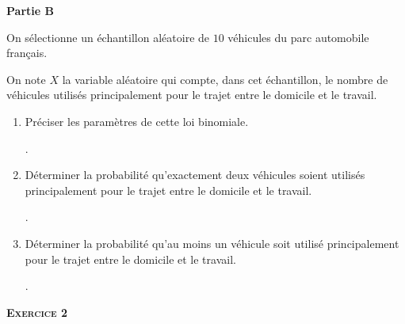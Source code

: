 \documentclass[11pt]{article}
\newcommand\Ra{\marginpar{\scalebox{.8}{\framebox[1.6ex]{\rule{0ex}{1.6ex}\raisebox{.75ex}{\rule{1.6ex}{.5pt}}}\hspace{-.3pt}\framebox[3.2ex]{Ra}}}}
\newcommand\Ca{\marginpar{\scalebox{.8}{\framebox[1.6ex]{\rule{0ex}{1.6ex}\raisebox{.75ex}{\rule{1.6ex}{.5pt}}}\hspace{-.3pt}\framebox[3.2ex]{Ca}}}}
\begin{document}
\textbf{Partie B}


On sélectionne un échantillon aléatoire de $10$ véhicules du parc automobile français. 

On note $X$ la variable aléatoire qui compte, dans cet échantillon, le nombre de véhicules utilisés principalement pour le trajet entre le domicile et le travail.

\begin{enumerate} 
\item Préciser les paramètres de cette loi binomiale.\\[25 pt]
\begin{minipage}[c]{.91\linewidth}
    .\dotfill\\
  \end{minipage}\Ra


\item Déterminer la probabilité qu’exactement deux véhicules soient utilisés principalement pour le trajet entre le domicile et le travail.\\[25 pt]
\begin{minipage}[c]{.91\linewidth}
    .\dotfill\\
  \end{minipage}\Ca


\item Déterminer la probabilité qu’au moins un véhicule soit utilisé principalement pour le trajet entre le domicile et le travail.\\[25 pt]
\begin{minipage}[c]{.91\linewidth}
    .\dotfill\\
  \end{minipage}\Ca


\end{enumerate}


\textbf{\textsc{Exercice 2}}
\end{document}
